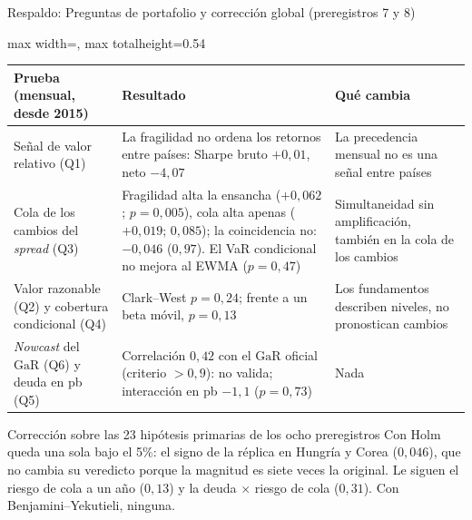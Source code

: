 \documentclass[aspectratio=169]{beamer}
\newcommand{\GaR}{\mathrm{GaR}}
\begin{document}
\begin{frame}{Respaldo: Preguntas de portafolio y corrección global (preregistros 7 y 8)}
\centering
\footnotesize
\begin{adjustbox}{max width=\textwidth, max totalheight=0.54\textheight}
\begin{tabular}{>{\raggedright\arraybackslash}p{}>{\raggedright\arraybackslash}p{}>{\raggedright\arraybackslash}p{}}
\toprule
Prueba (mensual, desde 2015) & Resultado & Qué cambia \\
\midrule
Señal de valor relativo (Q1) & La fragilidad no ordena los retornos entre países: Sharpe bruto $+0{,}01$, neto $-4{,}07$ & La precedencia mensual no es una señal entre países \\
\addlinespace
Cola de los cambios del \textit{spread} (Q3) & Fragilidad alta la ensancha ($+0{,}062$; $p=0{,}005$), cola alta apenas ($+0{,}019$; $0{,}085$); la coincidencia no: $-0{,}046$ ($0{,}97$). El VaR condicional no mejora al EWMA ($p=0{,}47$) & Simultaneidad sin amplificación, también en la cola de los cambios \\
\addlinespace
Valor razonable (Q2) y cobertura condicional (Q4) & Clark--West $p=0{,}24$; frente a un beta móvil, $p=0{,}13$ & Los fundamentos describen niveles, no pronostican cambios \\
\addlinespace
\textit{Nowcast} del $\GaR$ (Q6) y deuda en pb (Q5) & Correlación $0{,}42$ con el $\GaR$ oficial (criterio $>0{,}9$): no valida; interacción en pb $-1{,}1$ ($p=0{,}73$) & Nada \\
\bottomrule
\end{tabular}
\end{adjustbox}
\vspace{2pt}
\begin{block}{Corrección sobre las 23 hipótesis primarias de los ocho preregistros}
\scriptsize Con Holm queda una sola bajo el 5\%: el signo de la réplica en Hungría y Corea ($0{,}046$), que no cambia su veredicto porque la magnitud es siete veces la original. Le siguen el riesgo de cola a un año ($0{,}13$) y la deuda $\times$ riesgo de cola ($0{,}31$). Con Benjamini--Yekutieli, ninguna.
\end{block}
\end{frame}
\end{document}
